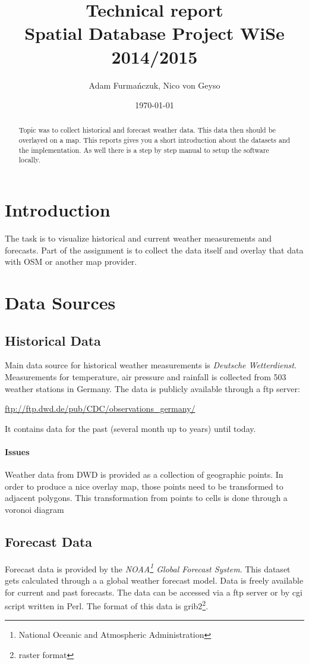 \documentclass{scrartcl}
\date{\today}
\author{Adam Furmańczuk, Nico von Geyso}
\title{
  Technical report \\
  \vspace{0.5cm}
  \small{Spatial Database Project WiSe 2014/2015}
}
\begin{document}
\maketitle

\begin{abstract}
  Topic was to collect historical and forecast weather data. This data then
  should be overlayed on a map. This reports gives you a short introduction
  about the datasets and the implementation. As well there is a step by step
  manual to setup the software locally.
\end{abstract}


\section{Introduction}
The task is to visualize historical and current weather measurements and
forecasts. Part of the assignment is to collect the data itself and overlay that
data with OSM or another map provider.


\section{Data Sources}
\subsection{Historical Data}
Main data source for historical weather measurements is \textit{Deutsche
Wetterdienst}. Measurements for temperature, air pressure and rainfall is
collected from 503 weather stations in Germany. The data is publicly available
through a ftp server:

\begin{center}\url{ftp://ftp.dwd.de/pub/CDC/observations_germany/}\end{center}

It contains data for the past (several month up to years) until today.

\paragraph{Issues}
Weather data from DWD is provided as a collection of geographic points. In order
to produce a nice overlay map, those points need to be transformed to adjacent
polygons. This transformation from points to cells is done through a voronoi
diagram

\subsection{Forecast Data}
Forecast data is provided by the \textit{NOAA\footnote{National Oceanic and
Atmospheric Administration} Global Forecast System}. This dataset gets
calculated through a a global weather forecast model. Data is freely available
for current and past forecasts. The data can be accessed via a ftp server or by
cgi script written in Perl. The format of this data is grib2\footnote{raster
format}.
\end{document}
